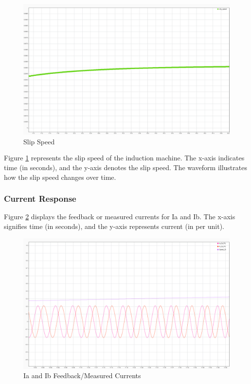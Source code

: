 \begin{figure}[H]
	\centering
	\includegraphics[width=6in]{sections/section3/images/simulationResutls/SlipSpeed.png}
	\caption{Slip Speed}
	\label{fig:slip_speed}
\end{figure}

Figure \ref{fig:slip_speed} represents the slip speed of the induction machine. The x-axis indicates time (in seconds), and the y-axis denotes the slip speed. The waveform illustrates how the slip speed changes over time. 





\subsubsection{Current Response}

Figure \ref{fig:current_response_IA_IB} displays the feedback or measured currents for Ia and Ib. The x-axis signifies time (in seconds), and the y-axis represents current (in per unit).

\begin{figure}[H]
	\centering
	\includegraphics[width=6in]{sections/section3/images/simulationResutls/Ia_Ib_fb.png}
	\caption{Ia and Ib Feedback/Measured Currents}
	\label{fig:current_response_IA_IB}
\end{figure}




